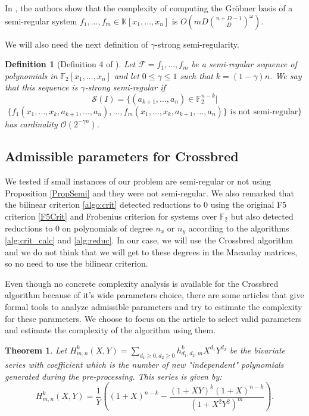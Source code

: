 \documentclass[english]{article}
\newtheorem{definition}{Definition}[section]
\newtheorem{theorem}{Theorem}[section]
\begin{document}
		In \cite{BFS15}, the authors show that the complexity of computing the Gröbner basis of a semi-regular system $f_1,...,f_m \in \mathbb{K}[x_1,...,x_n]$ is $O\left(mD\binom{n+D-1}{D}^\omega \right)$.
		
		
		We will also need the next definition of $\gamma$-strong semi-regularity.
		
		 \begin{definition}[Definition 4 of \cite{VID24}]
			Let $\mathcal{F} = {f_1,...,f_m}$ be a semi-regular sequence of polynomials in $\mathbb{F}_2[x_1,...,x_n]$ and let $0 \leq \gamma \leq 1$ such that $k = (1 - \gamma)n$. We say that this sequence is $\gamma$-strong semi-regular if
			$$
			\mathcal{S}(I) = \{(a_{k+1},...,a_n) \in \mathbb{F}_{2}^{n-k} |
			$$
			$$
			\{f_1(x_1,...,x_k,a_{k+1},...,a_n),...,f_m(x_1,...,x_k,a_{k+1},...,a_n)\} \text{ is not semi-regular}\}
			$$
			has cardinality $\mathcal{O}(2^{-\gamma n})$.
		\end{definition}
		
	\subsection{Admissible parameters for Crossbred}
		We tested if small instances of our problem are semi-regular or not using Proposition \ref{PropSemi} and they were not semi-regular. We also remarked that the bilinear criterion \ref{algo:crit} detected reductions to 0 using the original F5 criterion \ref{F5Crit} and Frobenius criterion for systems over $\mathbb{F}_2$ but also detected reductions to 0 on polynomials of degree $n_x$ or $n_y$ according to the algorithms \ref{alg:crit_calc} and \ref{alg:reduc}. In our case, we will use the Crossbred algorithm and we do not think that we will get to these degrees in the Macaulay matrices, so no need to use the bilinear criterion.
		
		Even though no concrete complexity analysis is available for the Crossbred algorithm because of it's wide parameters choice, there are some articles that give formal tools to analyze admissible parameters and try to estimate the complexity for these parameters. We choose to focus on the article \cite{VID24} to select valid parameters and estimate the complexity of the algorithm using them.
		
		\begin{theorem}\label{serie_=H}
			Let $H_{m, n}^k(X,Y) = \sum_{d_1 \geq 0, d_2 \geq 0} h_{d_1, d_2, m}^k X^{d_1}Y^{d_2}$ be the bivariate series with coefficient which is the number of new "independent" polynomials generated during the pre-processing. This series is given by:
			$$
				H_{m, n}^k(X, Y) = \frac{1}{Y}\left((1+X)^{n-k} - \frac{(1+XY)^k(1+X)^{n-k}}{(1+X^2Y^2)^m}\right).
			$$
		\end{theorem}
		
\end{document}
